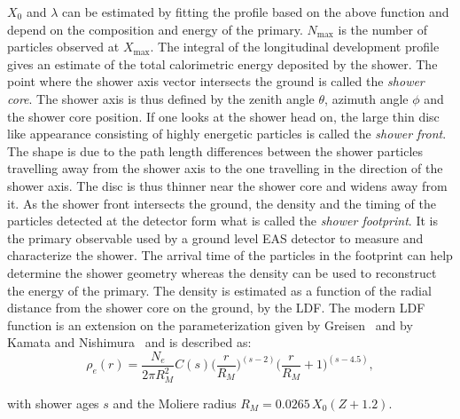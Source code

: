 $X_0$ and $\lambda$ can be estimated by fitting the profile based on the above function and depend on the composition and energy of the primary. $N_{\text{max}}$ is the number of particles observed at $X_{\text{max}}$. The integral of the longitudinal development profile gives an estimate of the total calorimetric energy deposited by the shower. 
The point where the shower axis vector intersects the ground is called the \textit{shower core}. The shower axis is thus defined by the zenith angle $\theta$, azimuth angle $\phi$ and the shower core position. If one looks at the shower head on, the large thin disc like appearance consisting of highly energetic particles is called the \textit{shower front}. The shape is due to the path length differences between the shower particles travelling away from the shower axis to the one travelling in the direction of the shower axis. The disc is thus thinner near the shower core and widens away from it. As the shower front intersects the ground, the density and the timing of the particles detected at the detector form what is called the \textit{shower footprint}. It is the primary observable used by a ground level EAS detector to measure and characterize the shower. The arrival time of the particles in the footprint can help determine the shower geometry whereas the density can be used to reconstruct the energy of the primary. The density is estimated as a function of the radial distance from the shower core on the ground, by the \gls{LDF}. The modern LDF function is an extension on the parameterization given by Greisen~\cite{annurev:/content/journals/10.1146/annurev.ns.10.120160.000431} and by Kamata and Nishimura~\cite{10.1143/PTPS.6.93} and is described as:
\begin{equation}
    \label{eq:Lateral_dist_func}
    \rho_e(r) = \frac{N_e}{2 \pi R_M^2} C(s) \biggl(\frac{r}{R_M}\biggr)^{(s-2)}\biggl(\frac{r}{R_M}+1\biggr)^{(s-4.5)},
\end{equation}

with shower ages $s$ and the Moliere radius $R_M = 0.0265 \,X_0(Z + 1.2)$.


